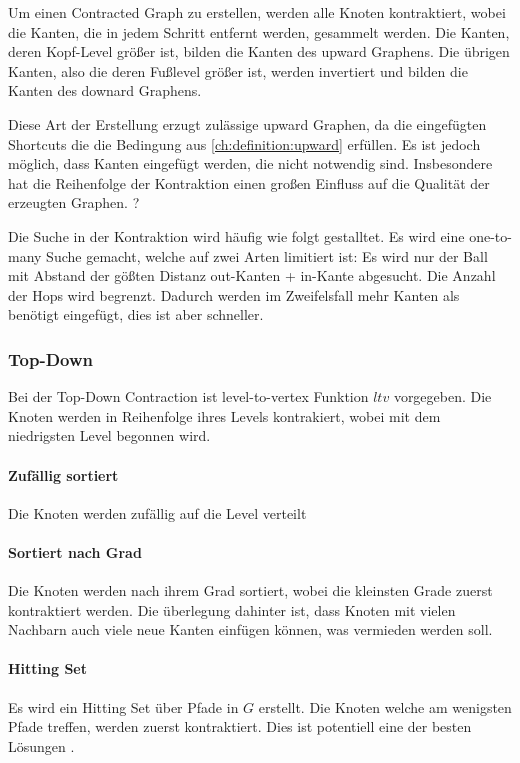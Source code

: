 Um einen Contracted Graph zu erstellen, werden alle Knoten kontraktiert, wobei die Kanten, die in jedem Schritt entfernt werden, gesammelt werden.
Die Kanten, deren Kopf-Level größer ist, bilden die Kanten des upward Graphens.
Die übrigen Kanten, also die deren Fußlevel größer ist, werden invertiert und bilden die Kanten des downard Graphens.

Diese Art der Erstellung erzugt zulässige upward Graphen, da die eingefügten Shortcuts die die Bedingung aus \autoref{ch:definition:upward} erfüllen.
Es ist jedoch möglich, dass Kanten eingefügt werden, die nicht notwendig sind.
Insbesondere hat die Reihenfolge der Kontraktion einen großen Einfluss auf die Qualität der erzeugten Graphen.
?

Die Suche in der Kontraktion wird häufig wie folgt gestalltet.
Es wird eine one-to-many Suche gemacht, welche auf zwei Arten limitiert ist:
Es wird nur der Ball mit Abstand der gößten Distanz out-Kanten + in-Kante abgesucht.
Die Anzahl der Hops wird begrenzt.
Dadurch werden im Zweifelsfall mehr Kanten als benötigt eingefügt, dies ist aber schneller.

\subsubsection{Top-Down}

Bei der Top-Down Contraction ist level-to-vertex Funktion ${ltv}$ vorgegeben.
Die Knoten werden in Reihenfolge ihres Levels kontrakiert, wobei mit dem niedrigsten Level begonnen wird.

\paragraph{Zufällig sortiert}
Die Knoten werden zufällig auf die Level verteilt

\paragraph{Sortiert nach Grad}
Die Knoten werden nach ihrem Grad sortiert, wobei die kleinsten Grade zuerst kontraktiert werden.
Die überlegung dahinter ist, dass Knoten mit vielen Nachbarn auch viele neue Kanten einfügen können, was vermieden werden soll.

\paragraph{Hitting Set}
Es wird ein Hitting Set über Pfade in $G$ erstellt.
Die Knoten welche am wenigsten Pfade treffen, werden zuerst kontraktiert.
Dies ist potentiell eine der besten Lösungen .

